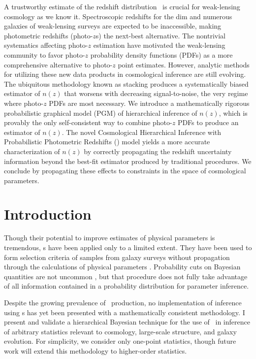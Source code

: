 A trustworthy estimate of the redshift distribution \nz\ is crucial for weak-lensing cosmology as we know it.
Spectroscopic redshifts for the dim and numerous galaxies of weak-lensing surveys are expected to be inaccessible, making photometric redshifts (photo-$z$s) the next-best alternative.
The nontrivial systematics affecting photo-$z$ estimation have motivated the weak-lensing community to favor photo-$z$ probability density functions (PDFs) as a more comprehensive alternative to photo-$z$ point estimates.
However, analytic methods for utilizing these new data products in cosmological inference are still evolving.
The ubiquitous methodology known as stacking produces a systematically biased estimator of $n(z)$ that worsens with decreasing signal-to-noise, the very regime where photo-$z$ PDFs are most necessary.
We introduce a mathematically rigorous probabilistic graphical model (PGM) of hierarchical inference of $n(z)$, which is provably the only self-consistent way to combine photo-$z$ PDFs to produce an estimator of $n(z)$.
The novel Cosmological Hierarchical Inference with Probabilistic Photometric Redshifts (\Chippr) model yields a more accurate characterization of $n(z)$ by correctly propagating the redshift uncertainty information beyond the best-fit estimator produced by traditional procedures.
We conclude by propagating these effects to constraints in the space of cosmological parameters.

\section{Introduction}

Though their potential to improve estimates of physical parameters is tremendous, \pzpdf s have been applied only to a limited extent.  
They have been used to form selection criteria of samples from galaxy surveys without propagation 
through the calculations of physical parameters \citep{VanBreukelen2009,Viironen2015}.  
Probability cuts on Bayesian quantities are not uncommon \citep{Leung2015, DiPompeo2015a}, but that procedure does not fully take advantage of all information contained in a probability distribution for parameter inference.  

Despite the growing prevalence of \pzpdf\ production, no implementation of inference using \pzpdf s has yet been presented with a mathematically consistent methodology.  
I present and validate a hierarchical Bayesian technique for the use of \pzpdf\ in inference of arbitrary statistics relevant to cosmology, large-scale structure, and galaxy evolution.  
For simplicity, we consider only one-point statistics, though future work will extend this methodology to higher-order statistics.

